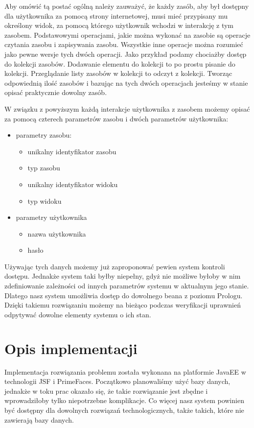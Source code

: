 \documentclass{classrep}
\begin{document}
Aby omówić tą postać ogólną należy zauważyć, że każdy zasób, aby był dostępny dla użytkownika za pomocą strony internetowej, musi mieć przypisany mu określony widok, za pomocą którego użytkownik
wchodzi w interakcję z tym zasobem. Podstawowymi operacjami, jakie można wykonać na zasobie są operacje czytania zasobu i zapisywania zasobu. Wszystkie inne operacje można
rozumieć jako pewne wersje tych dwóch operacji. Jako przykład podamy chociażby dostęp do kolekcji zasobów. Dodawanie elementu do kolekcji to po prostu pisanie do kolekcji.
Przeglądanie listy zasobów w kolekcji to odczyt z kolekcji. Tworząc odpowiednią ilość zasobów i bazując na tych dwóch operacjach jesteśmy w stanie opisać praktycznie dowolny zasób.

W związku z powyższym każdą interakcje użytkownika z zasobem możemy opisać za pomocą czterech parametrów zasobu i dwóch parametrów użytkownika:
\begin{itemize}
  \item parametry zasobu:
  \begin{itemize}
    \item unikalny identyfikator zasobu
    \item typ zasobu
    \item unikalny identyfikator widoku
    \item typ widoku
  \end{itemize}
  \item parametry użytkownika
  \begin{itemize}
    \item nazwa użytkownika
    \item hasło
  \end{itemize}
\end{itemize}

Używając tych danych możemy już zaproponować pewien system kontroli dostępu. Jednakże system taki byłby niepełny, gdyż nie możliwe byłoby w nim zdefiniowanie zależności od innych
parametrów systemu w aktualnym jego stanie. Dlatego nasz system umożliwia dostęp do dowolnego beana z poziomu Prologu. Dzięki takiemu rozwiązaniu możemy na bieżąco podczas weryfikacji
uprawnień odpytywać dowolne elementy systemu o ich stan.

\section{Opis implementacji}

Implementacja rozwiązania problemu została wykonana na platformie JavaEE w technologii JSF i PrimeFaces. Początkowo planowaliśmy użyć bazy danych, jednakże w toku prac okazało się,
że takie rozwiązanie jest zbędne i wprowadziłoby tylko niepotrzebne komplikacje. Co więcej nasz system powinien być dostępny dla dowolnych rozwiązań technologicznych, także takich, które nie
zawierają bazy danych.
\end{document}
